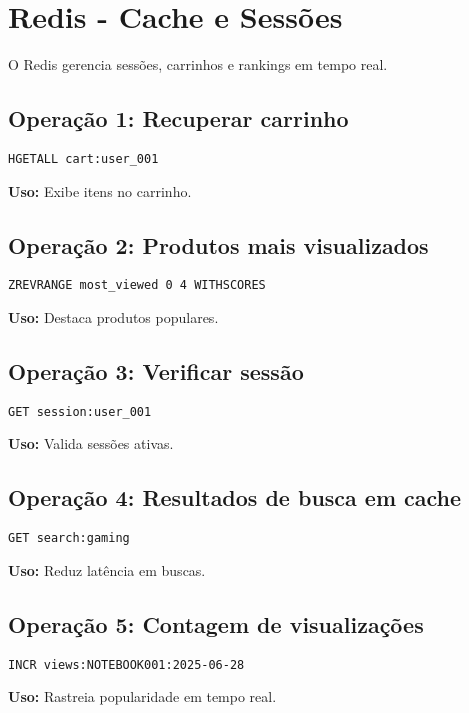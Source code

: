\documentclass[a4paper,12pt]{article}
\begin{document}
\section{Redis - Cache e Sessões}
O Redis gerencia sessões, carrinhos e rankings em tempo real.

\subsection{Operação 1: Recuperar carrinho}
\begin{lstlisting}[language=Redis]
HGETALL cart:user_001
\end{lstlisting}
\textbf{Uso:} Exibe itens no carrinho.

\subsection{Operação 2: Produtos mais visualizados}
\begin{lstlisting}[language=Redis]
ZREVRANGE most_viewed 0 4 WITHSCORES
\end{lstlisting}
\textbf{Uso:} Destaca produtos populares.

\subsection{Operação 3: Verificar sessão}
\begin{lstlisting}[language=Redis]
GET session:user_001
\end{lstlisting}
\textbf{Uso:} Valida sessões ativas.

\subsection{Operação 4: Resultados de busca em cache}
\begin{lstlisting}[language=Redis]
GET search:gaming
\end{lstlisting}
\textbf{Uso:} Reduz latência em buscas.

\subsection{Operação 5: Contagem de visualizações}
\begin{lstlisting}[language=Redis]
INCR views:NOTEBOOK001:2025-06-28
\end{lstlisting}
\textbf{Uso:} Rastreia popularidade em tempo real.
\end{document}
